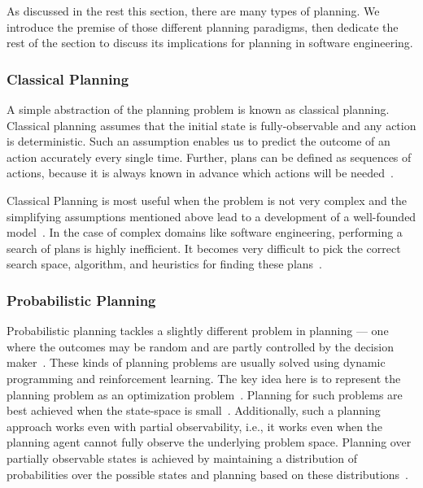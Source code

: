 \documentclass[10pt,journal,compsoc]{IEEEtran}
\begin{document}
As discussed in the rest this section, there are many  types of planning. We introduce the premise of those different planning paradigms, then dedicate the rest of the section to discuss its implications for planning in software engineering.

\subsubsection{Classical Planning}
A simple abstraction of the planning problem is known as classical planning. Classical planning assumes that the initial state is fully-observable and any action is deterministic. Such an assumption enables us to predict the outcome of an action accurately every single time. Further, plans can be defined as sequences of actions, because it is always known in advance which actions will be needed~\cite{strips}. 

Classical Planning is most useful when the problem is not very complex and the simplifying assumptions mentioned above lead to a development of a well-founded model~\cite{wooldridge95}.  In the case of complex domains like software engineering, performing a search of plans is highly inefficient. It becomes very difficult to pick the correct search space, algorithm, and heuristics for finding these plans~\cite{ghallab04}.

\subsubsection{Probabilistic Planning}
\label{sect:prob_plan}
Probabilistic planning tackles a slightly different problem in planning --- one where the outcomes may be random and are partly controlled by the decision maker~\cite{Bel, altman99, guo2009}. These kinds of planning problems are usually solved using dynamic programming and reinforcement learning. The key idea here is to represent the planning problem as an optimization problem~\cite{ghallab04}. Planning for such problems are best achieved when the state-space is small~\cite{ghallab04}. Additionally, such a planning approach works even with partial observability, i.e., it works even when the planning agent cannot fully observe the underlying problem space. Planning over partially observable states is achieved by maintaining a distribution of probabilities over the possible states and planning based on these distributions~\cite{kaelbling98}.
\end{document}
